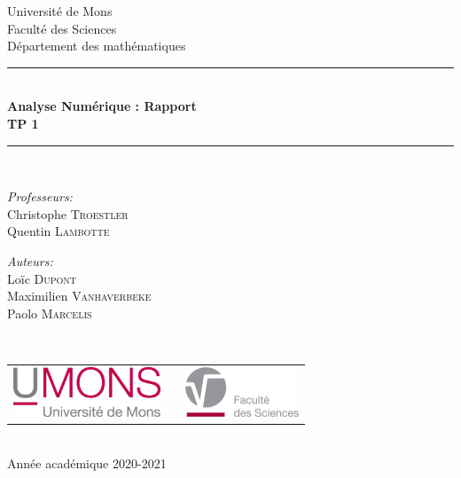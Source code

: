 \documentclass[a4paper, 12pt]{article}
\begin{document}
\begin{titlepage}
\begin{center}

{\Large Université de Mons}\\[1ex]
{\Large Faculté des Sciences}\\[1ex]
{\Large Département des mathématiques}\\[2.5cm]

\newcommand{\HRule}{\rule{\linewidth}{0.3mm}}
\HRule \\[0.3cm]
{ \LARGE \bfseries Analyse Numérique : Rapport \\[0.3cm]}
{ \LARGE \bfseries TP 1 \\[0.1cm]}
\HRule \\[1.5cm]

\begin{minipage}[t]{0.45\textwidth}
\begin{flushleft} \large
\emph{Professeurs:}\\
Christophe \textsc{Troestler} \\
Quentin \textsc{Lambotte}
\end{flushleft}
\end{minipage}
\begin{minipage}[t]{0.45\textwidth}
\begin{flushright} \large
\emph{Auteurs:} \\
Loïc \textsc{Dupont} \\
Maximilien \textsc{Vanhaverbeke} \\
Paolo \textsc{Marcelis}
\end{flushright}
\end{minipage}\\[2ex]

\vfill

\begin{center}
\begin{tabular}[t]{c c c}
\includegraphics[height=1.5cm]{logoumons.jpg} &
\hspace{0.3cm} &
\includegraphics[height=1.5cm]{logofs.jpg}
\end{tabular}
\end{center}~\\

{\large Année académique 2020-2021}

\end{center}
\end{titlepage}
\end{document}
